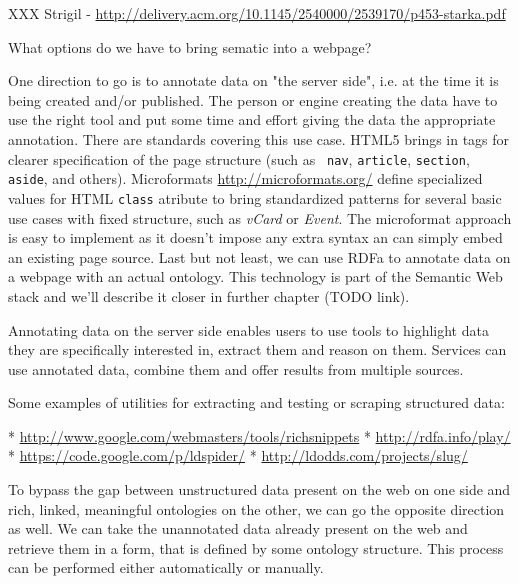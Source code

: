 XXX Strigil - \url{http://delivery.acm.org/10.1145/2540000/2539170/p453-starka.pdf}

What options do we have to bring sematic into a webpage? 


One direction to go is to annotate data on "the server side", i.e. at the time
it is being created and/or published. The person or engine creating the data
have to use the right tool and put some time and effort giving the data the
appropriate annotation. There are standards covering this use case. HTML5
brings in tags for clearer specification of the page structure (such as {\tt
nav}, {\tt article}, {\tt section}, {\tt aside}, and others). Microformats
\url{http://microformats.org/} define specialized values for HTML {\tt class}
atribute to bring standardized patterns for several basic use cases with fixed
structure, such as {\em vCard} or {\em Event}. The microformat approach is easy
to implement as it doesn't impose any extra syntax an can simply embed an
existing page source. Last but not least, we can use RDFa to annotate data on a
webpage with an actual ontology. This technology is part of the Semantic Web
stack and we'll describe it closer in further chapter (TODO link).

Annotating data on the server side enables users to use tools to highlight data
they are specifically interested in, extract them and reason on them. Services
can use annotated data, combine them and offer results from multiple sources. 

Some examples of utilities for extracting and testing or scraping structured data: 

\begitems
  * \url{http://www.google.com/webmasters/tools/richsnippets}
  * \url{http://rdfa.info/play/}
  * \url{https://code.google.com/p/ldspider/}
  * \url{http://ldodds.com/projects/slug/}
\enditems

To bypass the gap between unstructured data present on the web on one side and
rich, linked, meaningful ontologies on the other, we can go the opposite
direction as well. We can take the unannotated data already present on the web
and retrieve them in a form, that is defined by some ontology structure. This
process can be performed either automatically or manually. 

